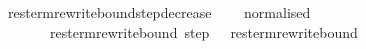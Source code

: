 \ res{\isacharunderscore}term{\isacharunderscore}rewrite{\isacharunderscore}bound{\isacharunderscore}step{\isacharunderscore}decrease{\isacharcolon}\isanewline
\ \ \ {\isachardoublequoteopen}{\isasymnot}\ normalised\ \isanewline
\ \ \ \ \ \ \ res{\isacharunderscore}term{\isacharunderscore}rewrite{\isacharunderscore}bound\ {\isacharparenleft}step\ \ {\isacharless}\ res{\isacharunderscore}term{\isacharunderscore}rewrite{\isacharunderscore}bound\ 
